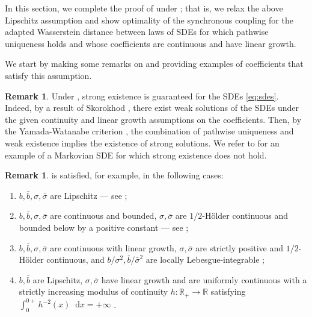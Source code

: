 \documentclass[oneside]{amsart}
\theoremstyle{definition}
\newtheorem{remark}[theorem]{Remark}
\newcommand{\R}{\mathbb R}
\newcommand{\D}{\mathop{}\!\mathrm{d}}
\def\R{{\mathbb R}}
\numberwithin{equation}{section}
\begin{document}
In this section, we complete the proof of  under ; that is, we relax the above Lipschitz assumption and show optimality of the synchronous coupling for the adapted Wasserstein distance between laws of SDEs for which pathwise uniqueness holds and whose coefficients are continuous and have linear growth. 

We start by making some remarks on  and providing examples of coefficients that satisfy this assumption.

\begin{remark}\label{rem:strong-existence}
	Under , strong existence is guaranteed for the SDEs \eqref{eq:sdes}. Indeed, by a result of Skorokhod \cite{Sk65}, there exist weak solutions of the SDEs under the given continuity and linear growth assumptions on the coefficients. Then, by the Yamada-Watanabe criterion \cite[Ch.\ 5, Corollary 3.23]{KaSh91}, the combination of pathwise uniqueness and weak existence implies the existence of strong solutions. We refer to \cite{CoRo22} for an example of a Markovian SDE for which strong existence does not hold.
\end{remark}

\begin{remark}\label{rem:main_ass}
	 is satisfied, for example, in the following cases:
	\begin{enumerate}[label=(\roman*)]
		\item $b, \bar{b}, \sigma, \bar{\sigma}$ are Lipschitz \cite[Proposition 1.9 (It\^o)]{ChEn05} --- see ;
		\item $b, \bar{b}, \sigma, \bar{\sigma}$ are continuous and bounded, $\sigma, \bar{\sigma}$ are $1/2$-H\"older continuous and bounded below by a positive constant \cite[Proposition 1.10 (Zvonkin)]{ChEn05} --- see ;
		\item $b, \bar{b}, \sigma, \bar{\sigma}$ are continuous with linear growth, $\sigma, \bar{\sigma}$ are strictly positive and $1/2$-H\"older continuous, and $b/\sigma^2, \bar{b}/\bar{\sigma}^2$ are locally Lebesgue-integrable \cite[Proposition 1.11 (Engelbert--Schmidt)]{ChEn05};
		\item $b, \bar{b}$ are Lipschitz, $\sigma, \bar{\sigma}$ have linear growth and are uniformly continuous with a strictly increasing modulus of continuity $h \colon \R_+ \to \R$ satisfying $\int_0^{0+}h^{-2}(x) \D x = +\infty$ \cite[Proposition 1.12 (Yamada--Watanabe)]{ChEn05}.
	\end{enumerate}
\end{remark}
\end{document}
